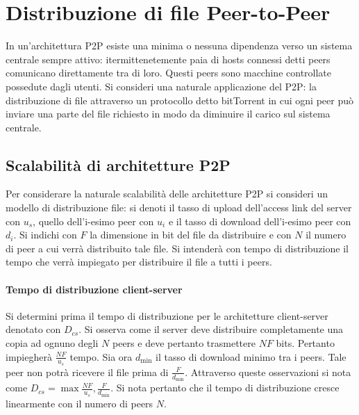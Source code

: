 \section{Distribuzione di file Peer-to-Peer}
In un'architettura P2P esiste una minima o nessuna dipendenza verso un sistema centrale sempre attivo: itermittenetemente paia di hosts connessi detti peers 
comunicano direttamente tra di loro. Questi peers sono macchine controllate possedute dagli utenti. Si consideri una naturale applicazione del P2P: la
distribuzione di file attraverso un protocollo detto bitTorrent in cui ogni peer pu\`o inviare una parte del file richiesto in modo da diminuire il carico
sul sistema centrale.
\subsection{Scalabilit\`a di architetture P2P}
Per considerare la naturale scalabilit\`a delle architetture P2P si consideri un modello di distribuzione file: si denoti il tasso di upload dell'access 
link del server con $u_s$, quello dell'i-esimo peer con $u_i$ e il tasso di download dell'i-esimo peer con $d_i$. Si indichi con $F$ la dimensione in bit
del file da distribuire e con $N$ il numero di peer a cui verr\`a distribuito tale file. Si intender\`a con tempo di distribuzione il tempo che verr\`a 
impiegato per distribuire il file a tutti i peers. 
\paragraph{Tempo di distribuzione client-server}
Si determini prima il tempo di distribuzione per le architetture client-server denotato con $D_{cs}$. Si 
osserva come il server deve distribuire completamente una copia ad ognuno degli $N$ peers e deve pertanto trasmettere $NF$ bits. Pertanto impiegher\`a 
$\frac{NF}{u_s}$ tempo. Sia ora $d_{\min}$ il tasso di download minimo tra i peers. Tale peer non potr\`a ricevere il file prima di $\frac{F}{d_{\min}}$. 
Attraverso queste osservazioni si nota come $D_{cs}=\max{\frac{NF}{u_s}, \frac{F}{d_{\min}}}$. Si nota pertanto che il tempo di distribuzione cresce 
linearmente con il numero di peers $N$. 
